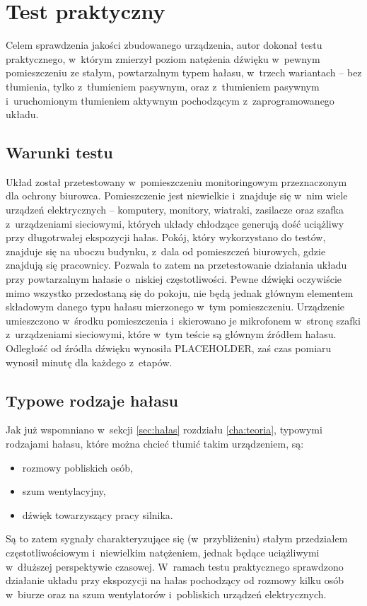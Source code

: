 \section{Test praktyczny}
\label{sec:practical_test}
Celem sprawdzenia jakości zbudowanego urządzenia, autor dokonał testu praktycznego, w~którym zmierzył poziom natężenia dźwięku w~pewnym pomieszczeniu ze stałym, powtarzalnym typem hałasu, w~trzech wariantach -- bez tłumienia, tylko z~tłumieniem pasywnym, oraz z~tłumieniem pasywnym i~uruchomionym tłumieniem aktywnym pochodzącym z~zaprogramowanego układu.
\subsection{Warunki testu}
\label{subsec:circumstances}
Układ został przetestowany w~pomieszczeniu monitoringowym przeznaczonym dla ochrony biurowca. Pomieszczenie jest niewielkie i~znajduje się w~nim wiele urządzeń elektrycznych -- komputery, monitory, wiatraki, zasilacze oraz szafka z~urządzeniami sieciowymi, których układy chłodzące generują dość uciążliwy przy długotrwałej ekspozycji hałas. Pokój, który wykorzystano do testów, znajduje się na uboczu budynku, z~dala od pomieszczeń biurowych, gdzie znajdują się pracownicy. Pozwala to zatem na przetestowanie działania układu przy powtarzalnym hałasie o~niskiej częstotliwości. Pewne dźwięki oczywiście mimo wszystko przedostaną się do pokoju, nie będą jednak głównym elementem składowym danego typu hałasu mierzonego w~tym pomieszczeniu. Urządzenie umieszczono w~środku pomieszczenia i~skierowano je mikrofonem w~stronę szafki z~urządzeniami sieciowymi, które w~tym teście są głównym źródłem hałasu. Odległość od źródła dźwięku wynosiła PLACEHOLDER, %
zaś czas pomiaru wynosił minutę dla każdego z~etapów.
\subsection{Typowe rodzaje hałasu}
Jak już wspomniano w~sekcji \ref{sec:hałas} rozdziału \ref{cha:teoria}, typowymi rodzajami hałasu, które można chcieć tłumić takim urządzeniem, są:
\begin{itemize}
	\item rozmowy pobliskich osób,
	\item szum wentylacyjny,
	\item dźwięk towarzyszący pracy silnika.
\end{itemize}
Są to zatem sygnały charakteryzujące się (w~przybliżeniu) stałym przedziałem częstotliwościowym i~niewielkim natężeniem, jednak będące uciążliwymi w~dłuższej perspektywie czasowej. W~ramach testu praktycznego sprawdzono działanie układu przy ekspozycji na hałas pochodzący od rozmowy kilku osób w~biurze oraz na szum wentylatorów i~pobliskich urządzeń elektrycznych.
